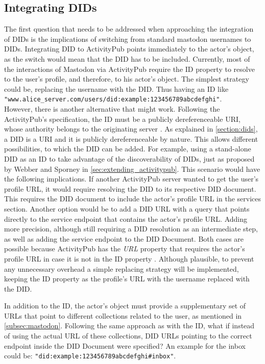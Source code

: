 \subsection{Integrating DIDs} \label{subsec:integrating_dids}
The first question that needs to be addressed when approaching the integration of DIDs is the implications of switching from standard mastodon usernames to DIDs. Integrating DID to ActivityPub points immediately to the actor's object, as the switch would mean that the DID has to be included. Currently, most of the interactions of Mastodon via ActivityPub require the ID property to resolve to the user's profile, and therefore, to his actor's object. The simplest strategy could be, replacing the username with the DID. Thus having an ID like \verb|"www.alice_server.com/users/did:example:123456789abcdefghi"|.\\
However, there is another alternative that might work. Following the ActivityPub's specification, the ID must be a publicly dereferenceable URI, whose authority belongs to the originating server \cite{lemmer-webber_tallon_guy_prodromou_2018}. As explained in \autoref{section:dids}, a DID is a URI and it is publicly dereferenceable by nature. This allows different possibilities, to which the DID can be added. For example, using a stand-alone DID as an ID to take advantage of the discoverability of DIDs, just as proposed by Webber and Sporney in \autoref{sec:extending_activitypub}. This scenario would have the following implications. If another ActivityPub server wanted to get the user's profile URL, it would require resolving the DID to its respective DID document. This requires the DID document to include the actor's profile URL in the services section. Another option would be to add a DID URL with a query that points directly to the service endpoint that contains the actor's profile URL. Adding more precision, although still requiring a DID resolution as an intermediate step, as well as adding the service endpoint to the DID Document. Both cases are possible because ActivityPub has the \emph{URL} property that requires the actor's profile URL in case it is not in the ID property \cite{lemmer-webber_tallon_guy_prodromou_2018}. Although plausible, to prevent any unnecessary overhead a simple replacing strategy will be implemented, keeping the ID property as the profile's URL with the username replaced with the DID.

In addition to the ID, the actor's object must provide a supplementary set of URLs that point to different collections related to the user, as mentioned in \autoref{subsec:mastodon}. Following the same approach as with the ID, what if instead of using the actual URL of these collections, DID URLs pointing to the correct endpoint inside the DID Document were specified? An example for the inbox could be: \verb|"did:example:123456789abcdefghi#inbox"|.

